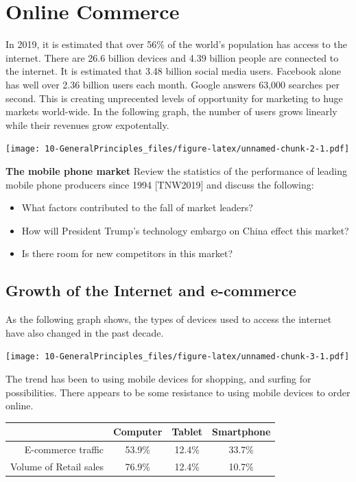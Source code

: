 \documentclass[]{book}
\providecommand{\tightlist}{%
  \setlength{\itemsep}{0pt}\setlength{\parskip}{0pt}}
\let\BeginKnitrBlock\begin \let\EndKnitrBlock\end
\begin{document}
\hypertarget{online-commerce}{%
\section{Online Commerce}\label{online-commerce}}

In 2019, it is estimated that over 56\% of the world's population has access to the internet. There are 26.6 billion devices and 4.39 billion people are connected to the internet. It is estimated that 3.48 billion social media users. Facebook alone has well over 2.36 billion users each month. Google answers 63,000 searches per second. This is creating unprecented levels of opportunity for marketing to huge markets world-wide. In the following graph, the number of users grows linearly while their revenues grow expotentally. \citep{Statista2019}

\texttt{[image: 10-GeneralPrinciples\_files/figure-latex/unnamed-chunk-2-1.pdf]}

\BeginKnitrBlock{rmddiscussion}
\textbf{The mobile phone market}
Review the statistics of the performance of leading mobile phone producers since 1994 {[}TNW2019{]} and discuss the following:

\begin{itemize}
\tightlist
\item
  What factors contributed to the fall of market leaders?
\item
  How will President Trump's technology embargo on China effect this market?
\item
  Is there room for new competitors in this market?
\end{itemize}
\EndKnitrBlock{rmddiscussion}

\hypertarget{growth-of-the-internet-and-e-commerce}{%
\subsection{Growth of the Internet and e-commerce}\label{growth-of-the-internet-and-e-commerce}}

As the following graph shows, the types of devices used to access the internet have also changed in the past decade.

\texttt{[image: 10-GeneralPrinciples\_files/figure-latex/unnamed-chunk-3-1.pdf]}

The trend has been to using mobile devices for shopping, and surfing for possibilities. There appears to be some resistance to using mobile devices to order online.

\begin{longtable}[]{@{}rccc@{}}
\toprule
& Computer & Tablet & Smartphone\tabularnewline
\midrule
\endhead
E-commerce traffic & 53.9\% & 12.4\% & 33.7\%\tabularnewline
Volume of Retail sales & 76.9\% & 12.4\% & 10.7\%\tabularnewline
\bottomrule
\end{longtable}
\end{document}
